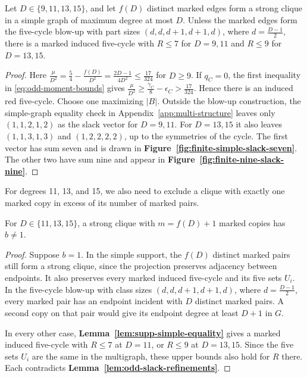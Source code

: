 \begin{lemma}\label{lem:supp-simple-equality}
Let $D\in\{9,11,13,15\}$, and let $f(D)$ distinct marked edges form
a strong clique in a simple graph of maximum degree at most $D$.
Unless the marked edges form the five-cycle blow-up with part sizes
$(d,d,d+1,d+1,d)$, where $d=\frac{D-1}{2}$, there is a marked
induced five-cycle with $R\le7$ for $D=9,11$ and $R\le9$ for $D=13,15$.
\end{lemma}

\begin{proof}
Here $\frac{\mu}{D^2}=\frac{5}{4}-\frac{f(D)}{D^2}
=\frac{2D-1}{4D^2}\le\frac{17}{324}$ for $D\ge9$.
If $q_C=0$, the first inequality in \eqref{eq:odd-moment-bounds}
gives $\frac{\mu}{D^2}\ge\frac{\gamma_C}{8}-\epsilon_C
>\frac{17}{324}$. Hence there is an induced red five-cycle.
Choose one maximizing $|B|$. Outside the blow-up construction, the simple-graph equality
check in Appendix~\ref{app:multi-structure} leaves only
$(1,1,2,1,2)$ as the slack vector for $D=9,11$. For $D=13,15$ it
also leaves $(1,1,3,1,3)$ and $(1,2,2,2,2)$, up to the symmetries
of the cycle. The first vector has sum seven and is drawn in
\textbf{Figure~\ref{fig:finite-simple-slack-seven}}. The other two
have sum nine and appear in \textbf{Figure~\ref{fig:finite-nine-slack-nine}}.
\end{proof}

For degrees 11, 13, and 15, we also need to exclude a clique with
exactly one marked copy in excess of its number of marked pairs.

\begin{lemma}\label{lem:single-extra-copy}
For $D\in\{11,13,15\}$, a strong clique with $m=f(D)+1$ marked
copies has $b\ne1$.
\end{lemma}

\begin{proof}
Suppose $b=1$. In the simple support, the $f(D)$ distinct marked
pairs still form a strong clique, since the projection preserves
adjacency between endpoints. It also preserves every marked induced
five-cycle and its five sets $U_i$. In the five-cycle blow-up with class sizes
$(d,d,d+1,d+1,d)$, where $d=\frac{D-1}{2}$, every marked pair has
an endpoint incident with $D$ distinct marked pairs. A second copy
on that pair would give its endpoint degree at least $D+1$ in $G$.

In every other case, \textbf{Lemma~\ref{lem:supp-simple-equality}}
gives a marked induced five-cycle with $R\le7$ at $D=11$, or
$R\le9$ at $D=13,15$. Since the five sets $U_i$ are the same
in the multigraph, these upper bounds
also hold for $R$ there. Each contradicts
\textbf{Lemma~\ref{lem:odd-slack-refinements}}.
\end{proof}
